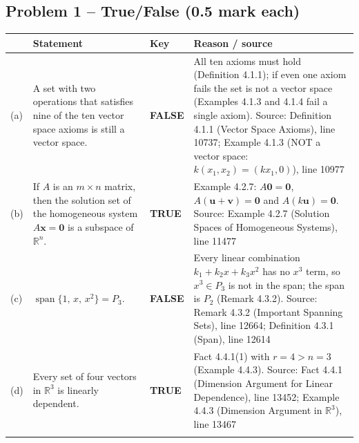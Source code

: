 \documentclass[11pt,a4paper]{article}
\newcommand{\Src}[1]{{\footnotesize\color{black!65}Source: #1}}
\begin{document}
\subsection*{Problem 1 -- True/False (0.5 mark each)}
\begin{tabularx}{\linewidth}{@{}l X l X@{}}\toprule & Statement & Key & Reason / source\\\midrule
(a) & A set with two operations that satisfies nine of the ten vector space axioms is still a vector space. & \textbf{FALSE} & All ten axioms must hold (Definition 4.1.1); if even one axiom fails the set is not a vector space (Examples 4.1.3 and 4.1.4 fail a single axiom). \Src{Definition 4.1.1 (Vector Space Axioms), line 10737; Example 4.1.3 (NOT a vector space: $k(x_1,x_2)=(kx_1,0)$), line 10977}\\\addlinespace
(b) & If $A$ is an $m\times n$ matrix, then the solution set of the homogeneous system $A\mathbf{x}=\mathbf{0}$ is a subspace of $\mathbb{R}^n$. & \textbf{TRUE} & Example 4.2.7: $A\mathbf{0}=\mathbf{0}$, $A(\mathbf{u}+\mathbf{v})=\mathbf{0}$ and $A(k\mathbf{u})=\mathbf{0}$. \Src{Example 4.2.7 (Solution Spaces of Homogeneous Systems), line 11477}\\\addlinespace
(c) & $\operatorname{span}\{1,\,x,\,x^2\}=P_3$. & \textbf{FALSE} & Every linear combination $k_1+k_2x+k_3x^2$ has no $x^3$ term, so $x^3\in P_3$ is not in the span; the span is $P_2$ (Remark 4.3.2). \Src{Remark 4.3.2 (Important Spanning Sets), line 12664; Definition 4.3.1 (Span), line 12614}\\\addlinespace
(d) & Every set of four vectors in $\mathbb{R}^3$ is linearly dependent. & \textbf{TRUE} & Fact 4.4.1(1) with $r=4>n=3$ (Example 4.4.3). \Src{Fact 4.4.1 (Dimension Argument for Linear Dependence), line 13452; Example 4.4.3 (Dimension Argument in $\mathbb{R}^3$), line 13467}\\\addlinespace
\bottomrule\end{tabularx}
\end{document}
